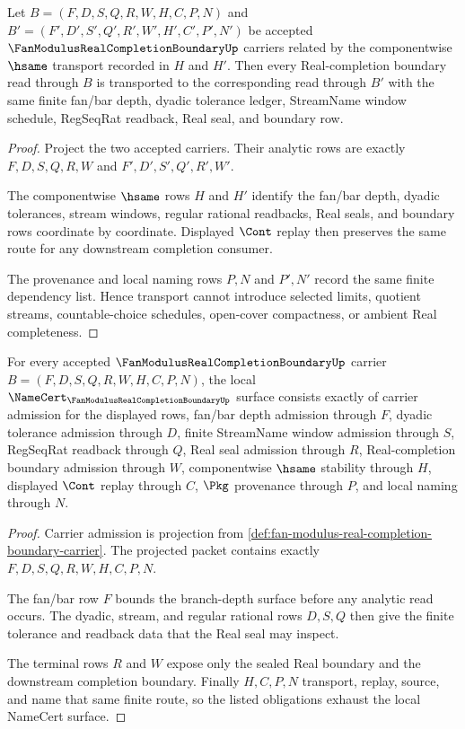\begin{theorem}
\label{thm:fan-modulus-real-completion-boundary-stability}
Let $B=(F,D,S,Q,R,W,H,C,P,N)$ and $B'=(F',D',S',Q',R',W',H',C',P',N')$ be accepted $\FanModulusRealCompletionBoundaryUp$ carriers related by the componentwise $\hsame$ transport recorded in $H$ and $H'$. Then every Real-completion boundary read through $B$ is transported to the corresponding read through $B'$ with the same finite fan/bar depth, dyadic tolerance ledger, StreamName window schedule, RegSeqRat readback, Real seal, and boundary row.
\end{theorem}
\begin{proof}
Project the two accepted carriers. Their analytic rows are exactly $F,D,S,Q,R,W$ and $F',D',S',Q',R',W'$.

The componentwise $\hsame$ rows $H$ and $H'$ identify the fan/bar depth, dyadic tolerances, stream windows, regular rational readbacks, Real seals, and boundary rows coordinate by coordinate. Displayed $\Cont$ replay then preserves the same route for any downstream completion consumer.

The provenance and local naming rows $P,N$ and $P',N'$ record the same finite dependency list. Hence transport cannot introduce selected limits, quotient streams, countable-choice schedules, open-cover compactness, or ambient Real completeness.
\end{proof}

\begin{theorem}
\label{thm:fan-modulus-real-completion-boundary-namecert-obligations}
For every accepted $\FanModulusRealCompletionBoundaryUp$ carrier $B=(F,D,S,Q,R,W,H,C,P,N)$, the local $\NameCert_{\FanModulusRealCompletionBoundaryUp}$ surface consists exactly of carrier admission for the displayed rows, fan/bar depth admission through $F$, dyadic tolerance admission through $D$, finite StreamName window admission through $S$, RegSeqRat readback through $Q$, Real seal admission through $R$, Real-completion boundary admission through $W$, componentwise $\hsame$ stability through $H$, displayed $\Cont$ replay through $C$, $\Pkg$ provenance through $P$, and local naming through $N$.
\end{theorem}
\begin{proof}
Carrier admission is projection from \autoref{def:fan-modulus-real-completion-boundary-carrier}. The projected packet contains exactly $F,D,S,Q,R,W,H,C,P,N$.

The fan/bar row $F$ bounds the branch-depth surface before any analytic read occurs. The dyadic, stream, and regular rational rows $D,S,Q$ then give the finite tolerance and readback data that the Real seal may inspect.

The terminal rows $R$ and $W$ expose only the sealed Real boundary and the downstream completion boundary. Finally $H,C,P,N$ transport, replay, source, and name that same finite route, so the listed obligations exhaust the local NameCert surface.
\end{proof}

